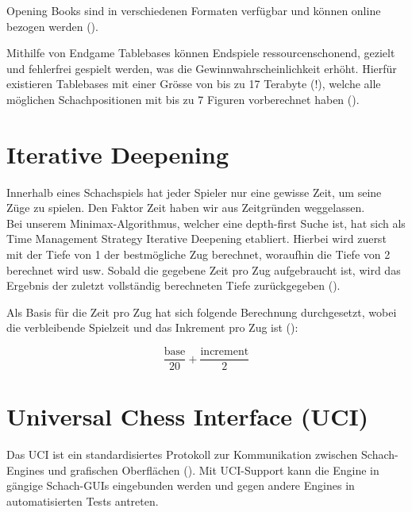Opening Books sind in verschiedenen Formaten verfügbar und können online bezogen werden (\cite{openingBook}).

Mithilfe von Endgame Tablebases können Endspiele ressourcenschonend, gezielt und fehlerfrei gespielt werden,
was die Gewinnwahrscheinlichkeit erhöht. Hierfür existieren Tablebases mit einer Grösse von bis zu 17 Terabyte (!),
welche alle möglichen Schachpositionen mit bis zu 7 Figuren vorberechnet haben (\cite{endGameTableBase, syzygyBases}).

\section{Iterative Deepening}

Innerhalb eines Schachspiels hat jeder Spieler nur eine gewisse Zeit, um seine Züge zu spielen. Den Faktor Zeit haben
wir aus Zeitgründen weggelassen. \\
Bei unserem Minimax-Algorithmus, welcher eine depth-first Suche ist, hat sich als Time Management Strategy Iterative
Deepening etabliert. Hierbei wird zuerst mit der Tiefe von 1 der bestmögliche Zug berechnet, woraufhin die Tiefe von 2 berechnet
wird usw. Sobald die gegebene Zeit pro Zug aufgebraucht ist, wird das Ergebnis der zuletzt vollständig berechneten Tiefe
zurückgegeben (\cite{iterativeDeepening}).

Als Basis für die Zeit pro Zug hat sich folgende Berechnung durchgesetzt, wobei  die verbleibende Spielzeit
und  das Inkrement pro Zug ist (\cite{timeManagement}):

\[\frac{\text{base}}{20} + \frac{\text{increment}}{2}\]

\section{Universal Chess Interface (UCI)}

Das UCI ist ein standardisiertes Protokoll zur Kommunikation zwischen Schach-Engines und grafischen Oberflächen (\cite{uci}).
Mit UCI-Support kann die Engine in gängige Schach-GUIs eingebunden werden und gegen andere Engines in automatisierten Tests antreten.
